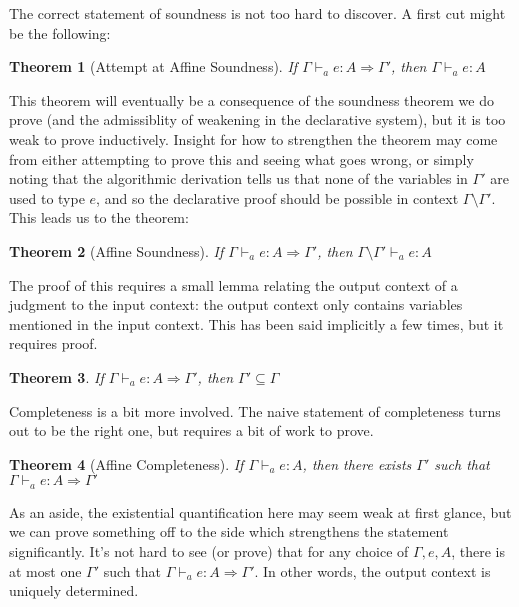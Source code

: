 \documentclass{article}
\newtheorem{theorem}{Theorem}
\theoremstyle{definition}
\newcommand{\gens}{\Rightarrow}
\begin{document}
The correct statement of soundness is not too hard to discover. A first cut might be the following:
\begin{theorem}[Attempt at Affine Soundness]
If $\Gamma \vdash_a e : A \gens \Gamma'$, then $\Gamma \vdash_a e : A$
\end{theorem}

This theorem will eventually be a consequence of the soundness theorem we do prove (and the admissiblity of weakening in the declarative system), but it is too weak to prove inductively. Insight for how to strengthen the theorem may come from either attempting to prove this and seeing what goes wrong, or simply noting that the algorithmic derivation tells us that none of the variables in $\Gamma'$ are used to type $e$, and so the declarative proof should be possible in context $\Gamma \setminus \Gamma'$. This leads us to the theorem:

\begin{theorem}[Affine Soundness]
If $\Gamma \vdash_a e : A \gens \Gamma'$, then $\Gamma \setminus \Gamma' \vdash_a e : A$
\end{theorem}

The proof of this requires a small lemma relating the output context of a judgment to the input context: the output context only contains variables mentioned in the input context. This has been said implicitly a few times, but it requires proof.

\begin{theorem}
If $\Gamma \vdash_a e : A \gens \Gamma'$, then $\Gamma' \subseteq \Gamma$
\end{theorem}

Completeness is a bit more involved. The naive statement of completeness turns out to be the right one, but requires a bit of work to prove.

\begin{theorem}[Affine Completeness]
If $\Gamma \vdash_a e : A$, then there exists $\Gamma'$ such that $\Gamma \vdash_a e : A \gens \Gamma'$
\end{theorem}

As an aside, the existential quantification here may seem weak at first glance, but we can prove something off to the side which strengthens the statement significantly. It's not hard to see (or prove) that for any choice of $\Gamma,e,A$, there is at most one $\Gamma'$ such that $\Gamma \vdash_a e : A \gens \Gamma'$. In other words, the output context is uniquely determined.
\end{document}
